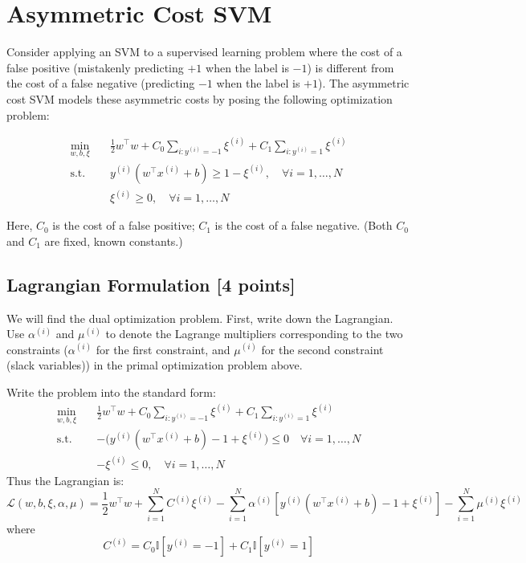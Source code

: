 \documentclass[lang=cn,11pt]{elegantbook}
\begin{document}
\section{Asymmetric Cost SVM} 
Consider applying an SVM to a supervised learning problem where the cost of a false positive (mistakenly predicting \(+1\) when the label is \(-1\)) is different from the cost of a false negative (predicting \(-1\) when the label is \(+1\)). The asymmetric cost SVM models these asymmetric costs by posing the following optimization problem:

\begin{align}
    \min_{w,b,\xi} \quad & \frac{1}{2} w^\top w + C_0 \sum_{i: y^{(i)} = -1} \xi^{(i)} + C_1 \sum_{i: y^{(i)} = 1} \xi^{(i)} \\
    \text{s.t.} \quad & y^{(i)}(w^\top x^{(i)} + b) \geq 1 - \xi^{(i)}, \quad \forall i = 1, \dots, N \\
    & \xi^{(i)} \geq 0, \quad \forall i = 1, \dots, N
\end{align}

Here, \(C_0\) is the cost of a false positive; \(C_1\) is the cost of a false negative. (Both \(C_0\) and \(C_1\) are fixed, known constants.)

\subsection{Lagrangian Formulation [4 points]}
We will find the dual optimization problem. First, write down the Lagrangian. Use \(\alpha^{(i)}\) and \(\mu^{(i)}\) to denote the Lagrange multipliers corresponding to the two constraints (\(\alpha^{(i)}\) for the first constraint, and \(\mu^{(i)}\) for the second constraint (slack variables)) in the primal optimization problem above.
\begin{solution} 
Write the problem into the standard form:  \begin{align}
    \min_{w,b,\xi} \quad & \frac{1}{2} w^\top w + C_0 \sum_{i: y^{(i)} = -1} \xi^{(i)} + C_1 \sum_{i: y^{(i)} = 1} \xi^{(i)} \\
    \text{s.t.} \quad &  -\Big(y^{(i)}(w^\top x^{(i)} + b)  - 1 + \xi^{(i)} \Big)\leq 0 \quad \forall i = 1, \dots, N \\
    & - \xi^{(i)} \leq 0, \quad \forall i = 1, \dots, N
\end{align}
Thus the Lagrangian is: 
\[
\mathcal{L}(w, b, \xi, \alpha, \mu) = \frac{1}{2} w^\top w + \sum_{i=1}^{N} C^{(i)} \xi^{(i)} - \sum_{i=1}^{N} \alpha^{(i)} \left[y^{(i)} (w^\top x^{(i)} + b) - 1 + \xi^{(i)} \right] - \sum_{i=1}^{N} \mu^{(i)} \xi^{(i)}
\]where \[
C^{(i)} = C_0 \mathbb{I}[y^{(i)} = -1] + C_1 \mathbb{I}[y^{(i)} = 1]
\]
\end{solution}
\end{document}
